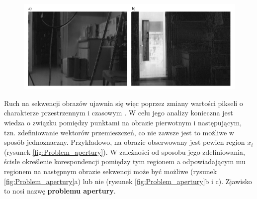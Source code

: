 \begin{figure}[!htb]
	\begin{center}
		\includegraphics[width=12cm]{images/image_difference_example.png}
	\end{center}	
\label{fig:Roznica_obrazow_przyklad}
\end{figure}

Ruch na sekwencji obrazów ujawnia się więc poprzez zmiany wartości pikseli o charakterze przestrzennym i czasowym \cite{Jaehne2005}. W celu jego analizy konieczna jest wiedza o związku pomiędzy punktami na obrazie pierwotnym i następującym, tzn. zdefiniowanie wektorów przemieszczeń, co nie zawsze jest to możliwe w sposób jednoznaczny. Przykładowo, na obrazie obserwowany jest pewien region $x_i$ (rysunek \ref{fig:Problem_apertury}). W zależności od sposobu jego zdefiniowania, ścisłe określenie korespondencji pomiędzy tym regionem a odpowiadającym mu regionem na następnym obrazie sekwencji może być możliwe (rysunek \ref{fig:Problem_apertury}a) lub nie (rysunek \ref{fig:Problem_apertury}b i c). Zjawisko to nosi nazwę \textbf{problemu apertury}.

